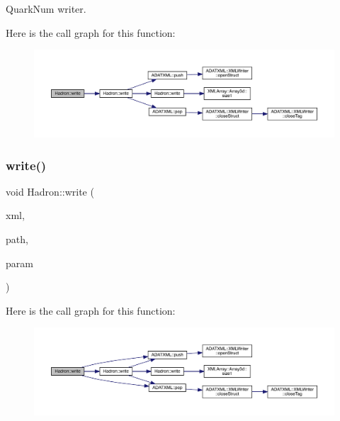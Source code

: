 Quark\+Num writer. 

Here is the call graph for this function\+:
\nopagebreak
\begin{figure}[H]
\begin{center}
\leavevmode
\includegraphics[width=350pt]{d1/daf/namespaceHadron_a44eb64f50cbbc947364a538026c97ee6_cgraph}
\end{center}
\end{figure}
\mbox{\label{namespaceHadron_a5dd8ceac99cd9e526324bf30fca8e225}} 
\subsubsection{\texorpdfstring{write()}{write()}\hspace{0.1cm}{\footnotesize\ttfamily [14/95]}}
{\footnotesize\ttfamily void Hadron\+::write (\begin{DoxyParamCaption}\item[{\mbox{\hyperlink{classADATXML_1_1XMLWriter}{X\+M\+L\+Writer}} \&}]{xml,  }\item[{const std\+::string \&}]{path,  }\item[{const \mbox{\hyperlink{structHadron_1_1KeyHadronSUNNPartNPtCorr__t_1_1NPoint__t}{Key\+Hadron\+S\+U\+N\+N\+Part\+N\+Pt\+Corr\+\_\+t\+::\+N\+Point\+\_\+t}} \&}]{param }\end{DoxyParamCaption})}

Here is the call graph for this function\+:
\nopagebreak
\begin{figure}[H]
\begin{center}
\leavevmode
\includegraphics[width=350pt]{d1/daf/namespaceHadron_a5dd8ceac99cd9e526324bf30fca8e225_cgraph}
\end{center}
\end{figure}
\mbox{\label{namespaceHadron_a4af69bc389ee44d25d1f3efa30042e4c}} 
